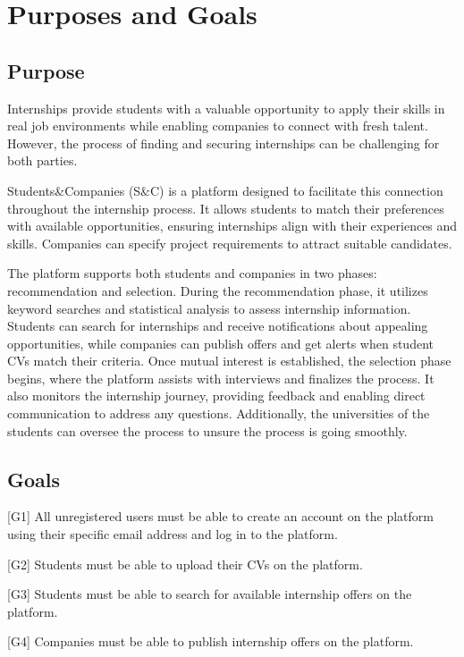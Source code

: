 \renewcommand{\thesection}{\Alph{section}}
\section{Purposes and Goals}\label{sec:purposeandgoals}
\subsection{Purpose}\label{subsec:purpose}
Internships provide students with a valuable opportunity to apply their skills in real job environments while enabling companies to connect with 
fresh talent. However, the process of finding and securing internships can be challenging for both parties.

Students\&Companies (S\&C) is a platform designed to facilitate this connection throughout the internship process. It allows 
students to match their preferences with available opportunities, ensuring internships align with their experiences and skills. 
Companies can specify project requirements to attract suitable candidates.

The platform supports both students and companies in two phases: recommendation and selection. During the recommendation phase, 
it utilizes keyword searches and statistical analysis to assess internship information. Students can search for internships and receive 
notifications about appealing opportunities, while companies can publish offers and get alerts when student CVs match their criteria.
Once mutual interest is established, the selection phase begins, where the platform assists with interviews and finalizes the process. 
It also monitors the internship journey, providing feedback and enabling direct communication to address any questions. Additionally, 
the universities of the students can oversee the process to unsure the process is going smoothly.

\subsection{Goals}\label{subsec:goals}
[G1] All unregistered users must be able to create an account on the platform using their specific email address and log in to the platform.

[G2] Students must be able to upload their CVs on the platform.

[G3] Students must be able to search for available internship offers on the platform.

[G4] Companies must be able to publish internship offers on the platform.

